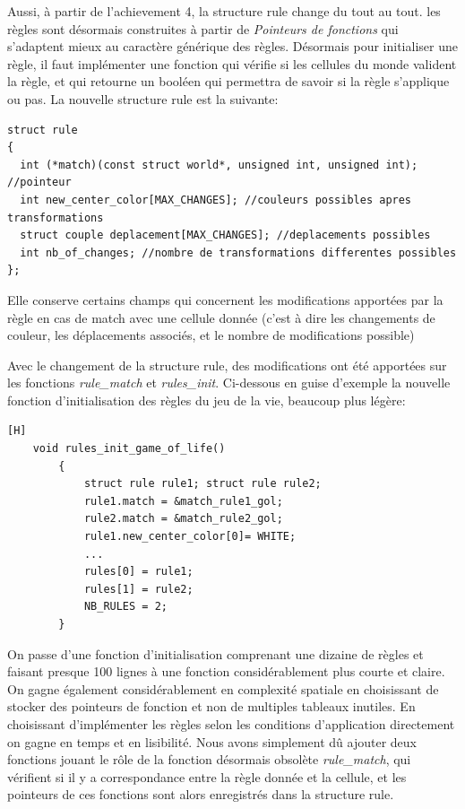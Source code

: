 \documentclass[11pt, a4paper]{article}
\begin{document}
Aussi, à partir de l'achievement 4, la structure rule change du tout au tout. les règles sont désormais construites à partir de \textit{Pointeurs de fonctions} qui s'adaptent mieux au caractère générique des règles. Désormais pour initialiser une règle, il faut implémenter une fonction qui vérifie si les cellules du monde valident la règle, et qui retourne un booléen qui permettra de savoir si la règle s'applique ou pas. La nouvelle structure rule est la suivante:\\

\begin{lstlisting}[frame = single]
struct rule
{
  int (*match)(const struct world*, unsigned int, unsigned int); //pointeur  
  int new_center_color[MAX_CHANGES]; //couleurs possibles apres transformations          
  struct couple deplacement[MAX_CHANGES]; //deplacements possibles    
  int nb_of_changes; //nombre de transformations differentes possibles
};
\end{lstlisting}

Elle conserve certains champs qui concernent les modifications apportées par la règle en cas de match avec une cellule donnée (c'est à dire les changements de couleur, les déplacements associés, et le nombre de modifications possible) 

Avec le changement de la structure rule, des modifications ont été apportées sur les fonctions \textit{rule\_match} et \textit{rules\_init}. Ci-dessous en guise d'exemple la nouvelle fonction d'initialisation des règles du jeu de la vie, beaucoup plus légère:\\

\begin{lstlisting}[frame = single][H]
    void rules_init_game_of_life()
        {
            struct rule rule1; struct rule rule2;
            rule1.match = &match_rule1_gol;
            rule2.match = &match_rule2_gol;
            rule1.new_center_color[0]= WHITE;
            ...
            rules[0] = rule1;
            rules[1] = rule2;
            NB_RULES = 2;
        }
\end{lstlisting}
On passe d'une fonction d'initialisation comprenant une dizaine de règles et faisant presque 100 lignes à une fonction considérablement plus courte et claire. On gagne également considérablement en complexité spatiale en choisissant de stocker des pointeurs de fonction et non de multiples tableaux inutiles. En choisissant d'implémenter les règles selon les conditions d'application directement on gagne en temps et en lisibilité. Nous avons simplement dû ajouter deux fonctions jouant le rôle de la fonction désormais obsolète \textit{rule\_match}, qui vérifient si il y a correspondance entre la règle donnée et la cellule, et les pointeurs de ces fonctions sont alors enregistrés dans la structure rule.
\end{document}

